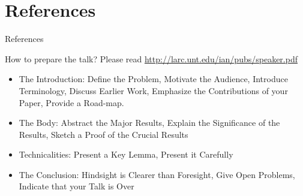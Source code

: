 \documentclass[11pt]{beamer}              %
\begin{document}
\section*{References}
\begin{frame}{References}
\tiny


\end{frame}

\begin{frame}{How to prepare the talk?}
Please read \url{http://larc.unt.edu/ian/pubs/speaker.pdf}
\begin{itemize}
\item The Introduction:  Define the Problem,    Motivate the Audience,    Introduce Terminology,    Discuss Earlier Work,    Emphasize the Contributions of your Paper,    Provide a Road-map.
\item The Body:    Abstract the Major Results, Explain the Significance of the Results, Sketch a Proof of the Crucial Results
\item Technicalities: Present a Key Lemma, Present it Carefully
\item The Conclusion: Hindsight is Clearer than Foresight, Give Open Problems, Indicate that your Talk is Over
\end{itemize}

\end{frame}



\thankslide
\end{document}
